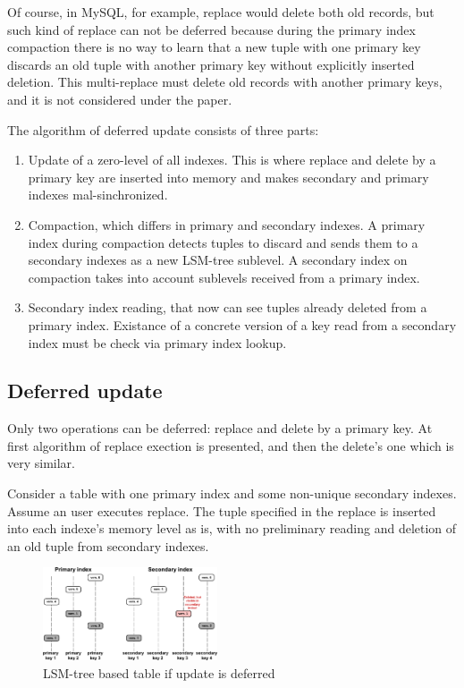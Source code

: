\documentclass{vldb}
\begin{document}
Of course, in MySQL, for example, replace would delete both old records, but
such kind of replace can not be deferred because during the primary index
compaction there is no way to learn that a new tuple with one primary key
discards an old tuple with another primary key without explicitly inserted
deletion. This multi-replace must delete old records with another primary keys,
and it is not considered under the paper.

The algorithm of deferred update consists of three parts:
\begin{enumerate}
\item Update of a zero-level of all indexes. This is where replace and delete by
a primary key are inserted into memory and makes secondary and primary indexes
mal-sinchronized.
\item Compaction, which differs in primary and secondary indexes. A primary
index during compaction detects tuples to discard and sends them to a secondary
indexes as a new LSM-tree sublevel. A secondary index on compaction takes into
account sublevels received from a primary index.
\item Secondary index reading, that now can see tuples already deleted from a
primary index. Existance of a concrete version of a key read from a secondary
index must be check via primary index lookup.
\end{enumerate}

\subsection{Deferred update}

Only two operations can be deferred: replace and delete by a primary key. At
first algorithm of replace exection is presented, and then the delete's one
which is very similar.

Consider a table with one primary index and some non-unique secondary indexes.
Assume an user executes replace. The tuple specified in the replace is inserted
into each indexe's memory level as is, with no preliminary reading and deletion
of an old tuple from secondary indexes.
\begin{figure}
\centering
\includegraphics[width=0.46\textwidth]{table_after_deferred_update}
\caption{LSM-tree based table if update is deferred}
\label{fig:table_after_deferred_update}
\end{figure}
\end{document}
